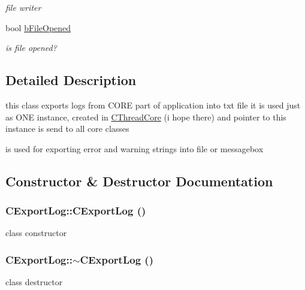 \begin{DoxyCompactItemize}
\begin{DoxyCompactList}\small\item\em file writer \item\end{DoxyCompactList}\item 
\hypertarget{classCExportLog_a5b29ac68edcc8ea73cd7d642060ec7b0}{
bool \hyperlink{classCExportLog_a5b29ac68edcc8ea73cd7d642060ec7b0}{bFileOpened}}
\label{classCExportLog_a5b29ac68edcc8ea73cd7d642060ec7b0}

\begin{DoxyCompactList}\small\item\em is file opened? \item\end{DoxyCompactList}\end{DoxyCompactItemize}


\subsection{Detailed Description}
this class exports logs from CORE part of application into txt file it is used just as ONE instance, created in \hyperlink{classCThreadCore}{CThreadCore} (i hope there) and pointer to this instance is send to all core classes

is used for exporting error and warning strings into file or messagebox 

\subsection{Constructor \& Destructor Documentation}
\hypertarget{classCExportLog_a9025e661ea014b4e9b84ec7507d1fce1}{
\subsubsection[{CExportLog}]{\setlength{\rightskip}{0pt plus 5cm}CExportLog::CExportLog ()}}
\label{classCExportLog_a9025e661ea014b4e9b84ec7507d1fce1}
class constructor \hypertarget{classCExportLog_a1dd4f328cf5efec31bf0a06e3d1ece0d}{
\subsubsection[{$\sim$CExportLog}]{\setlength{\rightskip}{0pt plus 5cm}CExportLog::$\sim$CExportLog ()}}
\label{classCExportLog_a1dd4f328cf5efec31bf0a06e3d1ece0d}
class destructor 

